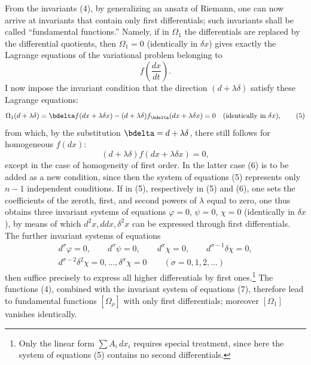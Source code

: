 \documentclass[11pt]{article}
\begin{document}
From the invariants (4), by generalizing an ansatz of Riemann, one can
now arrive at invariants that contain only first differentials; such
invariants shall be called ``fundamental functions.'' Namely, if in
\(\Omega_1\) the differentials are replaced by the differential quotients,
then \(\Omega_1=0\) (identically in \(\delta x\)) gives exactly the
Lagrange equations of the variational problem belonging to
\[
f\!\left(\frac{dx}{dt}\right).
\]
I now impose the invariant condition that the direction
\((d+\lambda\delta)\) satisfy these Lagrange equations:
\begin{equation}
\Omega_1(d+\lambda\delta)=
\bdelta f(dx+\lambda\delta x)
-(d+\lambda\delta)f_{\bdelta}(dx+\lambda\delta x)=0
\quad(\text{identically in }\delta x),
\tag{5}
\end{equation}
from which, by the substitution \(\bdelta=d+\lambda\delta\), there still
follows for homogeneous \(f(dx)\):
\begin{equation}
(d+\lambda\delta)f(dx+\lambda\delta x)=0,
\tag{6}
\end{equation}
except in the case of homogeneity of first order. In the latter case
(6) is to be added as a new condition, since then the system of equations
(5) represents only \(n-1\) independent conditions. If in (5), respectively
in (5) and (6), one sets the coefficients of the zeroth, first, and second
powers of \(\lambda\) equal to zero, one thus obtains three invariant
systems of equations
\(\varphi=0\), \(\psi=0\), \(\chi=0\) (identically in \(\delta x\)), by
means of which \(d^2x,ddx,\delta^2x\) can be expressed through first
differentials. The further invariant systems of equations
\begin{equation}
\begin{gathered}
d^\sigma\varphi=0,\qquad d^\sigma\psi=0,\qquad
d^\sigma\chi=0,\qquad d^{\sigma-1}\delta\chi=0,\\
d^{\sigma-2}\delta^2\chi=0,\ldots,\delta^\sigma\chi=0
\qquad(\sigma=0,1,2,\ldots)
\end{gathered}
\tag{7}
\end{equation}
then suffice precisely to express all higher differentials by first
ones.\footnote{Only the linear form \(\sum A_i\,dx_i\) requires special
treatment, since here the system of equations (5) contains no second
differentials.} The functions (4), combined with the invariant system of
equations (7), therefore lead to fundamental functions \([\Omega_\rho]\)
with only first differentials; moreover \([\Omega_1]\) vanishes
identically.
\end{document}
